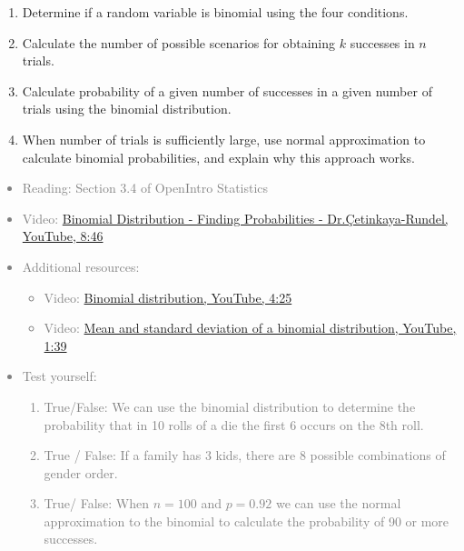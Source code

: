 \documentclass[11pt]{article}
\newcommand{\gray}[1]{\textcolor{gray}{#1}}
\begin{document}
%

\vspace{0.25cm}

%

\begin{enumerate}[resume]
\renewcommand\labelenumi{\textcolor{oiB}{\textbf{LO \theenumi.}}}

\item Determine if a random variable is binomial using the four conditions.

\item Calculate the number of possible scenarios for obtaining $k$ successes in $n$ trials.

\item Calculate probability of a given number of successes in a given number of trials using the binomial distribution.

\item When number of trials is sufficiently large, use normal approximation to calculate binomial probabilities, and explain why this approach works.

\end{enumerate}

%

\gray{
{\it
\vspace{-0.75cm}
\begin{itemize}
\renewcommand{\labelitemi}{{\textcolor{oiB}{$\ast$}}}
\item Reading: Section 3.4 of OpenIntro Statistics
\item Video: \href{http://www.youtube.com/watch?v=tKmyzhvgudw}{Binomial Distribution - Finding Probabilities - Dr.\c{C}etinkaya-Rundel, YouTube, 8:46}
\item Additional resources:
\begin{itemize}
\item Video: \href{http://www.youtube.com/watch?v=oYeJBdCGwxk&list=PL568547ACA9211CCA&index=28&feature=plpp_video}{Binomial distribution, YouTube, 4:25}
\item Video: \href{http://www.youtube.com/watch?v=0er3EiM-bpg&list=PL568547ACA9211CCA&index=27&feature=plpp_video}{Mean and standard deviation of a binomial distribution, YouTube, 1:39} 
\end{itemize}
\item Test yourself: 
\begin{enumerate}
\item True/False: We can use the binomial distribution to determine the probability that in 10 rolls of a die the first 6 occurs on the 8th roll.
\item True / False: If a family has 3 kids, there are 8 possible combinations of gender order.
\item True/ False: When $n = 100$ and $p = 0.92$ we can use the normal approximation to the binomial to calculate the probability of 90 or more successes.
\end{enumerate}
\end{itemize}
}}
\end{document}
